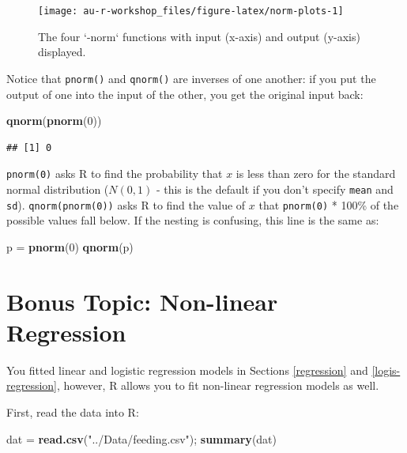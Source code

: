 \documentclass[]{book}
\newenvironment{Shaded}{\begin{snugshade}}{\end{snugshade}}
\newcommand{\DecValTok}[1]{\textcolor[rgb]{0.00,0.00,0.81}{#1}}
\newcommand{\KeywordTok}[1]{\textcolor[rgb]{0.13,0.29,0.53}{\textbf{#1}}}
\newcommand{\NormalTok}[1]{#1}
\newcommand{\StringTok}[1]{\textcolor[rgb]{0.31,0.60,0.02}{#1}}
\begin{document}
\begin{figure}

{\centering \texttt{[image: au-r-workshop\_files/figure-latex/norm-plots-1]} 

}

\caption{The four `-norm` functions with input (x-axis) and output (y-axis) displayed.}\label{fig:norm-plots}
\end{figure}

Notice that \texttt{pnorm()} and \texttt{qnorm()} are inverses of one another: if you put the output of one into the input of the other, you get the original input back:

\begin{Shaded}
\begin{Highlighting}[]
\KeywordTok{qnorm}\NormalTok{(}\KeywordTok{pnorm}\NormalTok{(}\DecValTok{0}\NormalTok{))}
\end{Highlighting}
\end{Shaded}

\begin{verbatim}
## [1] 0
\end{verbatim}

\texttt{pnorm(0)} asks R to find the probability that \(x\) is less than zero for the standard normal distribution (\(N(0,1)\) - this is the default if you don't specify \texttt{mean} and \texttt{sd}). \texttt{qnorm(pnorm(0))} asks R to find the value of \(x\) that \texttt{pnorm(0)} * 100\% of the possible values fall below. If the nesting is confusing, this line is the same as:

\begin{Shaded}
\begin{Highlighting}[]
\NormalTok{p =}\StringTok{ }\KeywordTok{pnorm}\NormalTok{(}\DecValTok{0}\NormalTok{)}
\KeywordTok{qnorm}\NormalTok{(p)}
\end{Highlighting}
\end{Shaded}

\hypertarget{nls}{%
\section{Bonus Topic: Non-linear Regression}\label{nls}}

You fitted linear and logistic regression models in Sections \ref{regression} and \ref{logis-regression}, however, R allows you to fit non-linear regression models as well.

First, read the data into R:

\begin{Shaded}
\begin{Highlighting}[]
\NormalTok{dat =}\StringTok{ }\KeywordTok{read.csv}\NormalTok{(}\StringTok{"../Data/feeding.csv"}\NormalTok{); }\KeywordTok{summary}\NormalTok{(dat)}
\end{Highlighting}
\end{Shaded}
\end{document}
